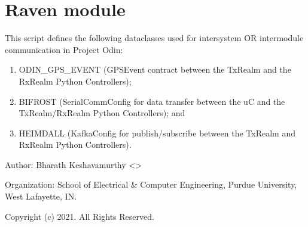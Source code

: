 \documentclass[letterpaper,10pt,english]{sphinxmanual}
\begin{document}
\section{Raven module}
\label{\detokenize{Raven:module-Raven}}\label{\detokenize{Raven:raven-module}}\label{\detokenize{Raven::doc}}
\sphinxAtStartPar
This script defines the following dataclasses used for inter\sphinxhyphen{}system OR inter\sphinxhyphen{}module communication in Project Odin:
\begin{enumerate}
%
\item {} 
\sphinxAtStartPar
ODIN\_GPS\_EVENT (GPSEvent contract between the TxRealm and the RxRealm Python Controllers);

\item {} 
\sphinxAtStartPar
BIFROST (SerialCommConfig for data transfer between the uC and the TxRealm/RxRealm Python Controllers); and

\item {} 
\sphinxAtStartPar
HEIMDALL (KafkaConfig for publish/subscribe between the TxRealm and RxRealm Python Controllers).

\end{enumerate}

\sphinxAtStartPar
Author: Bharath Keshavamurthy \textless{}\textgreater{}

\sphinxAtStartPar
Organization: School of Electrical \& Computer Engineering, Purdue University, West Lafayette, IN.

\sphinxAtStartPar
Copyright (c) 2021. All Rights Reserved.
\end{document}
